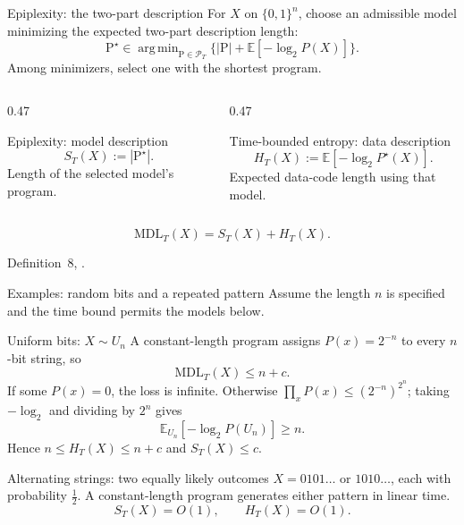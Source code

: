 \documentclass[aspectratio=169,notheorems]{beamer}
\theoremstyle{definition}
\newcommand{\E}{\mathbb{E}}
\newcommand{\MDL}{\mathrm{MDL}}
\newcommand{\PT}{\mathcal{P}_T}
\newcommand{\prog}{\mathrm{P}}
\DeclareMathOperator*{\argmin}{arg\,min}
\newcommand{\src}[1]{{\scriptsize\color{black!60}#1\par}}
\begin{document}
\begin{frame}{Epiplexity: the two-part description}
\small
For $X$ on $\{0,1\}^n$, choose an admissible model minimizing the expected two-part description length:
\[
\prog^\star\in\argmin_{\prog\in\PT}
\bigl\{|\prog|+\E[-\log_2 P(X)]\bigr\}.
\]
Among minimizers, select one with the shortest program.

\begin{columns}[T]
\begin{column}{0.47\textwidth}
\begin{block}{Epiplexity: model description}
\[
S_T(X):=|\prog^\star|.
\]
Length of the selected model's program.
\end{block}
\end{column}
\begin{column}{0.47\textwidth}
\begin{block}{Time-bounded entropy: data description}
\[
H_T(X):=\E[-\log_2 P^\star(X)].
\]
Expected data-code length using that model.
\end{block}
\end{column}
\end{columns}
\[
\MDL_T(X)=S_T(X)+H_T(X).
\]
\src{Definition~8, \citet{finzi2026}.}
\end{frame}
\begin{frame}{Examples: random bits and a repeated pattern}
\small
Assume the length $n$ is specified and the time bound permits the models below.

\begin{block}{Uniform bits: $X\sim U_n$}
A constant-length program assigns $P(x)=2^{-n}$ to every $n$-bit string, so
\[
\MDL_T(X)\le n+c.
\]
If some $P(x)=0$, the loss is infinite. Otherwise $\prod_xP(x)\le(2^{-n})^{2^n}$; taking $-\log_2$ and dividing by $2^n$ gives
\[
\mathbb E_{U_n}[-\log_2P(U_n)]\ge n.
\]
Hence $n\le H_T(X)\le n+c$ and $S_T(X)\le c$.
\end{block}

\begin{block}{Alternating strings: two equally likely outcomes}
$X=0101\ldots$ or $1010\ldots$, each with probability $\tfrac12$.
A constant-length program generates either pattern in linear time.
\[
S_T(X)=O(1),\qquad H_T(X)=O(1).
\]
\end{block}
\end{frame}
\end{document}
